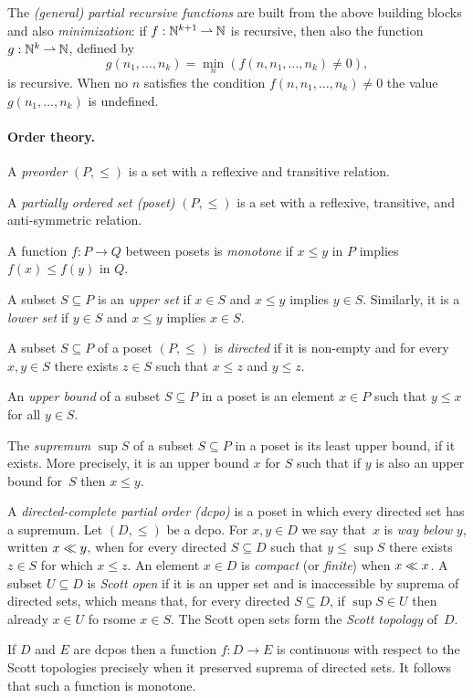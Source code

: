 The \emph{(general) partial recursive functions} are built from the
above building blocks and also \emph{minimization}: if $f :
\mathbb{N}^{k+1} \mathbin{\rightharpoonup} \mathbb{N}$ is recursive, then also the function $g : \mathbb{N}^k
\mathbin{\rightharpoonup} \mathbb{N}$, defined by
%
\begin{equation*}
  g(n_1, \ldots, n_k) = \min_n (f(n, n_1, \ldots, n_k) \neq 0),
\end{equation*}
%
is recursive. When no $n$ satisfies the condition $f(n, n_1, \ldots,
n_k) \neq 0$ the value $g(n_1, \ldots, n_k)$ is undefined.


\paragraph{Order theory.}

A \emph{preorder} $(P, {\leq})$ is a set with a reflexive and
transitive relation.

A \emph{partially ordered set (poset)} $(P, {\leq})$ is a set with a
reflexive, transitive, and anti-symmetric relation.

A function $f : P \to Q$ between posets is \emph{monotone} if $x \leq
y$ in $P$ implies $f(x) \leq f(y)$ in $Q$.

A subset $S \subseteq P$ is an \emph{upper set} if $x \in S$ and $x
\leq y$ implies $y \in S$. Similarly, it is a \emph{lower set} if $y
\in S$ and $x \leq y$ implies $x \in S$.

A subset $S \subseteq P$ of a poset $(P, {\leq})$ is \emph{directed}
if it is non-empty and for every $x, y \in S$ there exists $z \in S$
such that $x \leq z$ and $y \leq z$.

An \emph{upper bound} of a subset $S \subseteq P$ in a poset is an
element $x \in P$ such that $y \leq x$ for all $y \in S$.

The \emph{supremum} $\sup S$ of a subset $S \subseteq P$ in a poset is
its least upper bound, if it exists. More precisely, it is an upper
bound $x$ for $S$ such that if $y$ is also an upper bound for~$S$ then
$x \leq y$.

A \emph{directed-complete partial order (dcpo)} is a poset in which
every directed set has a supremum. Let $(D, {\leq})$ be a dcpo. For
$x, y \in D$ we say that~$x$ is \emph{way below} $y$, written $x \ll
y$, when for every directed $S \subseteq D$ such that $y \leq \sup S$
there exists $z \in S$ for which $x \leq z$. An element $x \in D$ is
\emph{compact} (or \emph{finite}) when $x \ll x$. A subset $U
\subseteq D$ is \emph{Scott open} if it is an upper set and is
inaccessible by suprema of directed sets, which means that, for every
directed $S \subseteq D$, if $\sup S \in U$ then already $x \in U$ fo
rsome $x \in S$. The Scott open sets form the \emph{Scott topology}
of~$D$.

If $D$ and $E$ are dcpos then a function $f : D \to E$ is continuous
with respect to the Scott topologies precisely when it preserved
suprema of directed sets. It follows that such a function is monotone.




